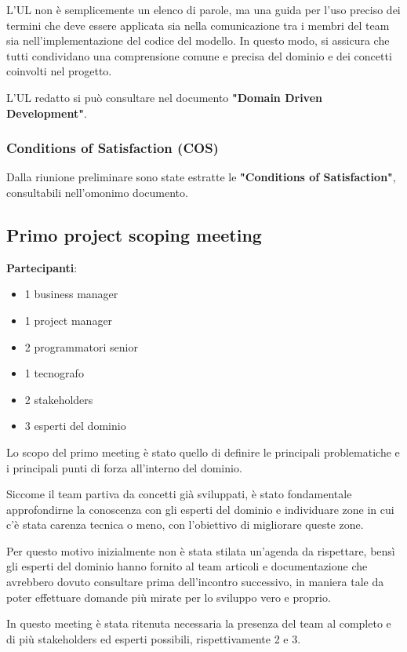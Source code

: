 L'UL non è semplicemente un elenco di parole, ma una guida per l'uso preciso dei
termini che deve essere applicata sia nella comunicazione tra i membri del team sia nell'implementazione del
codice del modello. In questo modo, si assicura che tutti condividano una comprensione comune e precisa del
dominio e dei concetti coinvolti nel progetto.

L'UL redatto si può consultare nel documento \textbf{"Domain Driven Development"}.

\subsubsection{Conditions of Satisfaction (COS)}
Dalla riunione preliminare sono state estratte le \textbf{"Conditions of Satisfaction"}, consultabili nell'omonimo documento.

\subsection{Primo project scoping meeting}
\textbf{Partecipanti}:
\begin{itemize}
    \item 1 business manager
    \item 1 project manager
    \item 2 programmatori senior
    \item 1 tecnografo
    \item 2 stakeholders
    \item 3 esperti del dominio
\end{itemize}
Lo scopo del primo meeting è stato quello di definire le principali problematiche e i principali punti di forza all'interno del dominio.

Siccome il team partiva da concetti già sviluppati, è stato fondamentale approfondirne la conoscenza con gli esperti del dominio e
individuare zone in cui c'è stata carenza tecnica o meno, con l'obiettivo di migliorare queste zone.

Per questo motivo inizialmente non è stata stilata un'agenda da rispettare, bensì gli esperti del dominio hanno fornito al team articoli e documentazione
che avrebbero dovuto consultare prima dell'incontro successivo, in maniera tale da poter effettuare domande più mirate per lo sviluppo vero e proprio.

In questo meeting è stata ritenuta necessaria la presenza del team al completo e di più stakeholders ed esperti possibili, rispettivamente 2 e 3.

